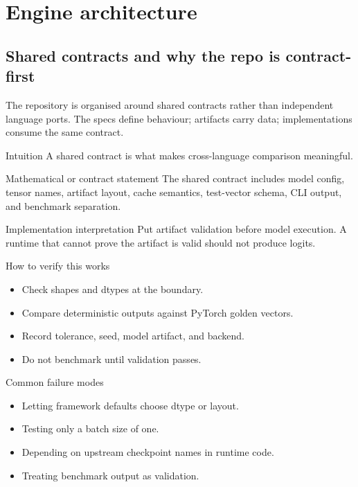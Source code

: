\part{Engine architecture}

\chapter{Shared contracts and why the repo is contract-first}
\label{ch:shared-contracts}
The repository is organised around shared contracts rather than independent language ports. The specs define behaviour; artifacts carry data; implementations consume the same contract.



\begin{intuitionbox}{Intuition}
A shared contract is what makes cross-language comparison meaningful.
\end{intuitionbox}

\begin{definitionbox}{Mathematical or contract statement}
The shared contract includes model config, tensor names, artifact layout, cache semantics, test-vector schema, CLI output, and benchmark separation.
\end{definitionbox}

\begin{implementationbox}{Implementation interpretation}
Put artifact validation before model execution. A runtime that cannot prove the artifact is valid should not produce logits.
\end{implementationbox}

\begin{verificationbox}{How to verify this works}
\begin{itemize}
\item Check shapes and dtypes at the boundary.
\item Compare deterministic outputs against PyTorch golden vectors.
\item Record tolerance, seed, model artifact, and backend.
\item Do not benchmark until validation passes.
\end{itemize}
\end{verificationbox}

\begin{warningbox}{Common failure modes}
\begin{itemize}
\item Letting framework defaults choose dtype or layout.
\item Testing only a batch size of one.
\item Depending on upstream checkpoint names in runtime code.
\item Treating benchmark output as validation.
\end{itemize}
\end{warningbox}

